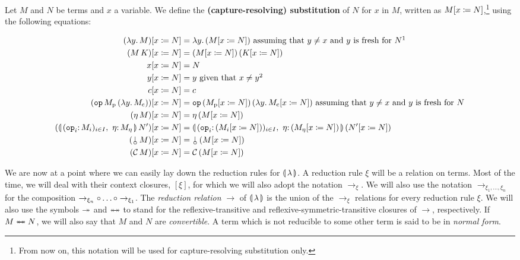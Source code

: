 \begin{definition}\label{def:capture-resolving-substitution}
  Let $M$ and $N$ be terms and $x$ a variable. We define the
  \textbf{(capture-resolving) substitution} of $N$ for $x$ in $M$, written
  as $M[x \coloneqq N]$,\footnote{From now on, this notation will be used
    for capture-resolving substitution only.} using the following
  equations:

  \begin{align*}
    \subst{(\lam{y}{M})}{x}{N} &= \lam{y}{(\subst{M}{x}{N})} \textrm{ assuming
      that } y \neq x \textrm{ and $y$ is fresh for $N$} \footnotemark \\
    \subst{(\ap{M}{K})}{x}{N} &= \ap{(\subst{M}{x}{N})}{(\subst{K}{x}{N})} \\
    \subst{x}{x}{N} &= N \\
    \subst{y}{x}{N} &= y \textrm{ given that } x \neq y \footnotemark \\
    \subst{c}{x}{N} &= c \\
    \subst{(\app{\op{op}}{M_\petitp}{(\lam{y}{M_\petitc})})}{x}{N}
    &= \app{\op{op}}{(\subst{M_\petitp}{x}{N})}{(\lam{y}{\subst{M_\petitc}{x}{N}})}
    \textrm{ assuming that } y \neq x \textrm{ and $y$ is fresh for $N$} \\
    \subst{(\ap{\eta}{M})}{x}{N} &= \ap{\eta}{(\subst{M}{x}{N})} \\
    \subst{(\ap{\cibanana}{N'})}{x}{N} &= \ap{\banana{(\onto{\op{op}_i}
      (\subst{M_i}{x}{N}))_{i \in I},\ \onto{\eta} (\subst{M_\eta}{x}{N})}}
      {(\subst{N'}{x}{N})} \\
    \subst{(\ap{\cherry}{M})}{x}{N} &= \ap{\cherry}{(\subst{M}{x}{N})} \\
    \subst{(\ap{\CC}{M})}{x}{N} &= \ap{\CC}{(\subst{M}{x}{N})}
  \end{align*}
\end{definition}

\addtocounter{footnote}{-1}

We are now at a point where we can easily lay down the reduction rules for
${\llparenthesis \, \lambda \, \rrparenthesis}$. A reduction rule $\xi$ will be a relation on terms. Most of
the time, we will deal with their context closures, $[\xi]$, for which we
will also adopt the notation $\to_\xi$. We will also use the notation
$\to_{\xi_1,\dots,\xi_n}$ for the composition
$\to_{\xi_n} {\mathbin{\circ}} \dots {\mathbin{\circ}} \to_{\xi_1}$. The \emph{reduction relation}
$\to$ of $\llparenthesis \, \lambda \, \rrparenthesis$ is the union of the $\to_\xi$ relations for
every reduction rule $\xi$. We will also use the symbols $\twoheadrightarrow$ and
$\twoheadleftarrow \mathrel{\mkern-15mu} \twoheadrightarrow$ to stand for the reflexive-transitive and
reflexive-symmetric-transitive closures of $\to$, respectively. If
$M \twoheadleftarrow \mathrel{\mkern-15mu} \twoheadrightarrow N$, we will also say that $M$ and $N$ are \emph{convertible}.
A term which is not reducible to some other term is said to be in
\emph{normal form}.

